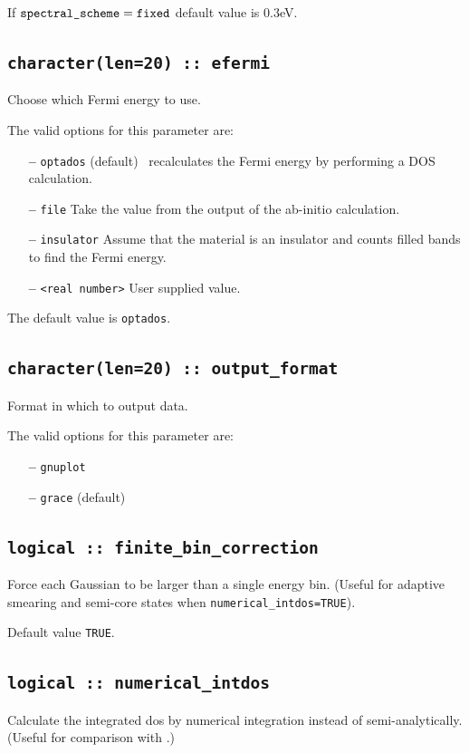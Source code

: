 \documentclass[a4paper,11pt,twoside]{book}
\begin{document}
If $\verb#spectral_scheme# = \verb#fixed#$ default value is 0.3eV.

\subsection[compute\_efermi]{{\tt character(len=20) :: efermi}}
Choose which Fermi energy to use.

The valid options for this parameter are:
\begin{itemize}
\item[{\bf --}]  \verb#optados# (default) \optados\ recalculates the Fermi energy by performing a DOS calculation. 
\item[{\bf --}]  \verb#file# Take the value from the output of the ab-initio calculation.
\item[{\bf --}]  \verb#insulator# Assume that the material is an insulator and counts filled bands to find the Fermi energy.
\item[{\bf --}]  \verb#<real number># User supplied value.
\end{itemize}

The default value is {\tt optados}.


\subsection[output\_format]{\tt character(len=20) :: output\_format}
Format in which to output data.

The valid options for this parameter are:
\begin{itemize}
\item[{\bf --}]  \verb#gnuplot# 
\item[{\bf --}]  \verb#grace# (default)
\end{itemize}

\subsection[finite\_bin\_correction]{\tt logical :: finite\_bin\_correction}
Force each Gaussian to be larger than a single energy bin. (Useful for adaptive smearing and semi-core states when \verb#numerical_intdos=TRUE#). 

Default value \verb#TRUE#.

\subsection[numerical\_intdos]{\tt logical :: numerical\_intdos}
Calculate the integrated dos by numerical integration instead of semi-analytically. (Useful for comparison with \lindos.)
\end{document}
